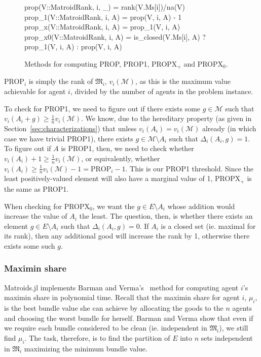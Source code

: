 \begin{figure}[ht!]
\begin{jllisting}
prop(V::MatroidRank, i, _) = rank(V.Ms[i])/na(V)
prop_1(V::MatroidRank, i, A) = prop(V, i, A) - 1
prop_x(V::MatroidRank, i, A) = prop_1(V, i, A)
prop_x0(V::MatroidRank, i, A) = 
    is_closed(V.Ms[i], A) ? prop_1(V, i, A) : prop(V, i, A)
\end{jllisting}
\caption{Methods for computing PROP, PROP1, PROPX$_+$ and PROPX$_0$.}
\end{figure}

PROP$_i$ is simply the rank of $\mathfrak{M}_i$, $v_i(\mathcal{M})$, as this is the maximum value achievable for agent $i$, divided by the number of agents in the problem instance.

To check for PROP1, we need to figure out if there exists some $g\in\mathcal{M}$ such that $v_i(A_i+g)\geq \frac{1}{n}v_i(\mathcal{M})$. We know, due to the hereditary property (as given in Section~\ref{sec:characterizations}) that unless $v_i(A_i) = v_i(\mathcal{M})$ already (in which case we have trivial PROP1), there exists $g\in\mathcal{M}\setminus A_i$ such that $\Delta_i(A_i, g) = 1$. To figure out if $A$ is PROP1, then, we need to check whether $v_i(A_i) + 1 \geq \frac{1}{n}v_i(\mathcal{M})$, or equivalently, whether $v_i(A_i) \geq \frac{1}{n}v_i(\mathcal{M})-1 = \text{PROP}_i - 1$. This is our PROP1 threshold. Since the least positively-valued element will also have a marginal value of 1, PROPX$_+$ is the same as PROP1.

When checking for PROPX$_0$, we want the $g\in E\setminus A_i$ whose addition would increase the value of $A_i$ the least. The question, then, is whether there exists an element $g\in E\setminus A_i$ such that $\Delta_i(A_i, g) = 0$. If $A_i$ is a closed set (ie. maximal for its rank), then any additional good will increase the rank by 1, otherwise there exists some such $g$.

\subsubsection*{Maximin share}
Matroids.jl implements Barman and Verma's~\cite[Appendix A]{barman2021existence} method for computing agent $i$'s maximin share in polynomial time. Recall that the maximin share for agent $i$,  $\mu_i$, is the best bundle value she can achieve by allocating the goods to the $n$ agents and choosing the worst bundle for herself. Barman and Verma show that even if we require each bundle considered to be clean (ie. independent in $\mathfrak{M}_i$), we still find $\mu_i$. The task, therefore, is to find the partition of $E$ into $n$ sets independent in $\mathfrak{M}_i$ maximizing the minimum bundle value.

